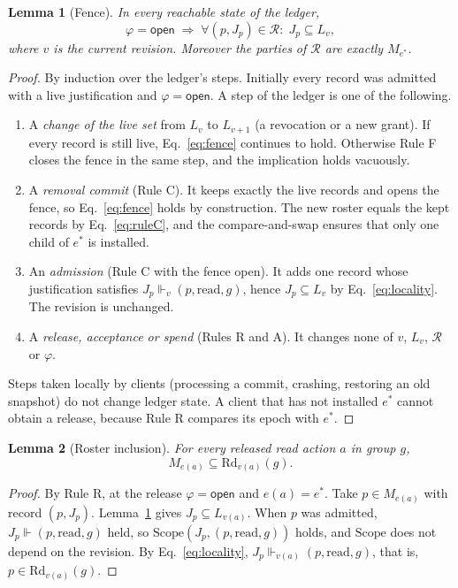 \documentclass[aps,prx,reprint,superscriptaddress,nofootinbib,floatfix]{revtex4-2}
\newtheorem{lemma}{Lemma}
\theoremstyle{remark}
\newcommand{\Live}{L}                     %
\newcommand{\justifies}{\Vdash}           %
\newcommand{\Rd}{\mathrm{Rd}}             %
\newcommand{\cut}{v}                      %
\newcommand{\roster}{M}
\newcommand{\rec}{\mathcal R}             %
\newcommand{\open}{\textsf{open}}
\newcommand{\Static}{\mathrm{Scope}}
\begin{document}
\begin{lemma}[Fence]\label{lem:fence}
In every reachable state of the ledger,
\begin{equation}
\varphi=\open \;\Longrightarrow\; \forall (p,J_p)\in\rec:\; J_p\subseteq\Live_v ,
\label{eq:fence}
\end{equation}
where $v$ is the current revision. Moreover the parties of $\rec$ are exactly $\roster_{e^\ast}$.
\end{lemma}
\begin{proof}
By induction over the ledger's steps. Initially every record was admitted with a live justification and $\varphi=\open$. A step of the ledger is one of the following.
\begin{enumerate}
\item A \emph{change of the live set} from $\Live_v$ to $\Live_{v+1}$ (a revocation or a new grant). If every record is still live, Eq.~\eqref{eq:fence} continues to hold. Otherwise Rule F closes the fence in the same step, and the implication holds vacuously.
\item A \emph{removal commit} (Rule C). It keeps exactly the live records and opens the fence, so Eq.~\eqref{eq:fence} holds by construction. The new roster equals the kept records by Eq.~\eqref{eq:ruleC}, and the compare-and-swap ensures that only one child of $e^\ast$ is installed.
\item An \emph{admission} (Rule C with the fence open). It adds one record whose justification satisfies $J_p\justifies_v(p,\text{read},g)$, hence $J_p\subseteq\Live_v$ by Eq.~\eqref{eq:locality}. The revision is unchanged.
\item A \emph{release, acceptance or spend} (Rules R and A). It changes none of $v$, $\Live_v$, $\rec$ or $\varphi$.
\end{enumerate}
Steps taken locally by clients (processing a commit, crashing, restoring an old snapshot) do not change ledger state. A client that has not installed $e^\ast$ cannot obtain a release, because Rule R compares its epoch with $e^\ast$.
\end{proof}

\begin{lemma}[Roster inclusion]\label{lem:roster}
For every released read action $a$ in group $g$,
\begin{equation}
\roster_{e(a)} \subseteq \Rd_{\cut(a)}(g).
\label{eq:roster}
\end{equation}
\end{lemma}
\begin{proof}
By Rule R, at the release $\varphi=\open$ and $e(a)=e^\ast$. Take $p\in\roster_{e(a)}$ with record $(p,J_p)$. Lemma~\ref{lem:fence} gives $J_p\subseteq\Live_{\cut(a)}$. When $p$ was admitted, $J_p\justifies(p,\text{read},g)$ held, so $\Static(J_p,(p,\text{read},g))$ holds, and $\Static$ does not depend on the revision. By Eq.~\eqref{eq:locality}, $J_p\justifies_{\cut(a)}(p,\text{read},g)$, that is, $p\in\Rd_{\cut(a)}(g)$.
\end{proof}
\end{document}
